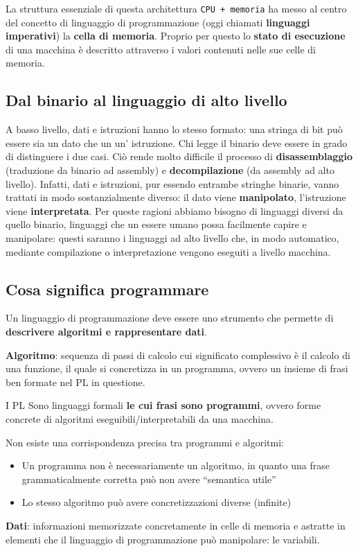 \documentclass[12pt,a4paper]{article}
\begin{document}
La struttura essenziale di questa architettura \texttt{CPU + memoria} ha messo al centro del concetto di linguaggio di programmazione (oggi chiamati \textbf{linguaggi imperativi}) la \textbf{cella di memoria}. Proprio per questo lo \textbf{stato di esecuzione} di una macchina è descritto attraverso i valori contenuti nelle sue celle di memoria.

\subsection{Dal binario al linguaggio di alto livello}
A basso livello, dati e istruzioni hanno lo stesso formato: una stringa di bit può essere sia un dato che un un' istruzione. Chi legge il binario deve essere in grado di distinguere i due casi. Ciò rende molto difficile il processo di \textbf{disassemblaggio} (traduzione da binario ad assembly) e \textbf{decompilazione} (da assembly ad alto livello). Infatti, dati e istruzioni, pur essendo entrambe stringhe binarie, vanno trattati in modo sostanzialmente diverso: il dato viene \textbf{manipolato}, l'istruzione viene \textbf{interpretata}.
Per queste ragioni abbiamo bisogno di linguaggi diversi da quello binario, linguaggi che un essere umano possa facilmente capire e manipolare: questi saranno i linguaggi ad alto livello che, in modo automatico, mediante compilazione o interpretazione vengono eseguiti a livello macchina.

\subsection{Cosa significa programmare}
Un linguaggio di programmazione deve essere uno strumento che permette di \textbf{descrivere algoritmi e rappresentare dati}.

\textbf{Algoritmo}: sequenza di passi di calcolo cui significato complessivo è il calcolo di una funzione, il quale si concretizza in un programma, ovvero un insieme di frasi ben formate nel PL in questione. 

I PL Sono linguaggi formali \textbf{le cui frasi sono programmi}, ovvero forme concrete di algoritmi eseguibili/interpretabili da una macchina.

Non esiste una corrispondenza precisa tra programmi e algoritmi:
\begin{itemize}
\item Un programma non è necessariamente un algoritmo, in quanto una frase grammaticalmente corretta può non avere ``semantica utile''
\item Lo stesso algoritmo può avere concretizzazioni diverse (infinite)
\end{itemize}
\textbf{Dati}: informazioni memorizzate concretamente in celle di memoria e astratte in elementi che il linguaggio di programmazione può manipolare: le variabili.
\end{document}
